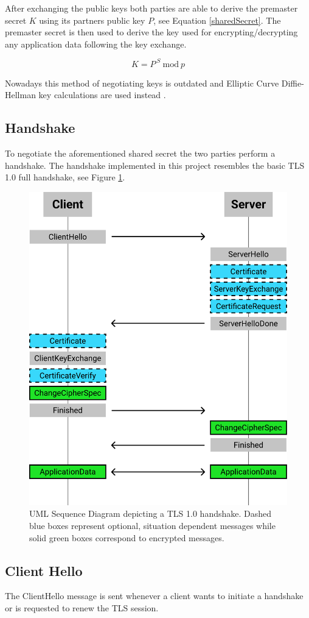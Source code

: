 \documentclass[12pt, letterpaper]{article}
\begin{document}
 After exchanging the public keys both parties are able to derive the premaster secret $K$ using its partners public key $P$, see Equation \ref{sharedSecret}. The premaster secret is then used to derive the key used for encrypting/decrypting any application data following the key exchange.

\begin{equation}\label{sharedSecret}
	K = P^{\ S}\ \mathrm{mod}\ p
\end{equation}
 

Nowadays this method of negotiating keys is outdated and Elliptic Curve Diffie-Hellman key calculations are used instead \cite{jablon2001ieee}.

\subsection{Handshake}
To negotiate the aforementioned shared secret the two parties perform a handshake. The handshake implemented in this project resembles the basic TLS 1.0 full handshake, see Figure \ref{fig:handshake}.

\begin{figure}[H]
	\centering
	\includegraphics[width=.6\textwidth]{Handshake}
	\caption{UML Sequence Diagram depicting a TLS 1.0 handshake. Dashed blue boxes represent optional, situation dependent messages while solid green boxes correspond to encrypted messages. \cite{dierks1999rfc2246}}
	\label{fig:handshake}
\end{figure}

\subsection*{Client Hello}
The ClientHello message is sent whenever a client wants to initiate a handshake or is requested to renew the TLS session.
\end{document}
